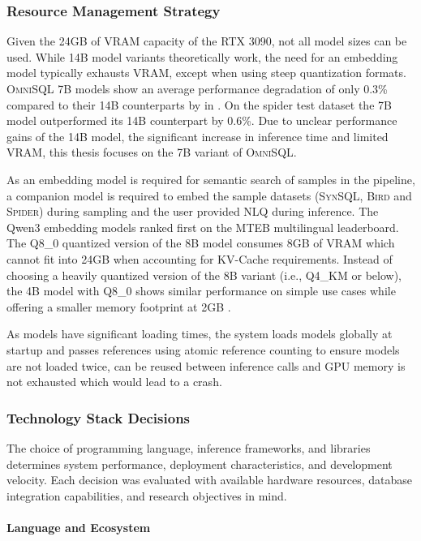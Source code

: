 \subsubsection{Resource Management Strategy}

Given the 24GB of VRAM capacity of the RTX 3090, not all model sizes can be
used. While 14B model variants theoretically work, the need for an embedding
model typically exhausts VRAM, except when using steep quantization formats.
\textsc{OmniSQL} 7B models show an average performance degradation of only
0.3\% compared to their 14B counterparts by \citeauthor{OmniSQL} in
\citeyear{OmniSQL}. On the spider test dataset the 7B model outperformed its
14B counterpart by 0.6\%. Due to unclear performance gains of the 14B model,
the significant increase in inference time and limited VRAM, this thesis
focuses on the 7B variant of \textsc{OmniSQL}.

As an embedding model is required for semantic search of samples in the
pipeline, a companion model is required to embed the sample datasets
(\textsc{SynSQL}, \textsc{Bird} and \textsc{Spider}) during sampling and
the user provided NLQ during inference. The Qwen3 embedding models ranked first
on the MTEB multilingual leaderboard. The Q8\_0 quantized version of the 8B
model consumes 8GB of VRAM which cannot fit into 24GB when accounting for
KV-Cache requirements. Instead of choosing a heavily quantized version of the
8B variant (i.e., Q4\_KM or below), the 4B model with Q8\_0 shows similar
performance on simple use cases while offering a smaller memory footprint at
2GB \citep{Qwen3Embed}.

As models have significant loading times, the system loads models globally
at startup and passes references using atomic reference counting to ensure
models are not loaded twice, can be reused between inference calls and GPU
memory is not exhausted which would lead to a crash.

\subsubsection{Technology Stack Decisions}

The choice of programming language, inference frameworks, and libraries
determines system performance, deployment characteristics, and development
velocity. Each decision was evaluated with available hardware resources,
database integration capabilities, and research objectives in mind.

\paragraph{Language and Ecosystem}

